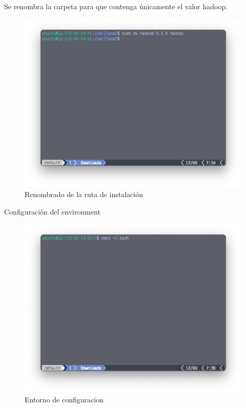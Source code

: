 Se renombra la carpeta para que contenga únicamente el valor hadoop.
\begin{figure}[h]
	\centering
	\includegraphics[scale=.35] {img/21-rename}
	\caption{Renombrado de la ruta de instalación}
	\label{fig:21}
\end{figure}

\clearpage

Configuración del environment

 \begin{figure}[h]
	\centering
	\includegraphics[scale=.35] {img/22-editBashRc}
	\caption{Entorno de configuracion}
	\label{fig:22}	
\end{figure}

